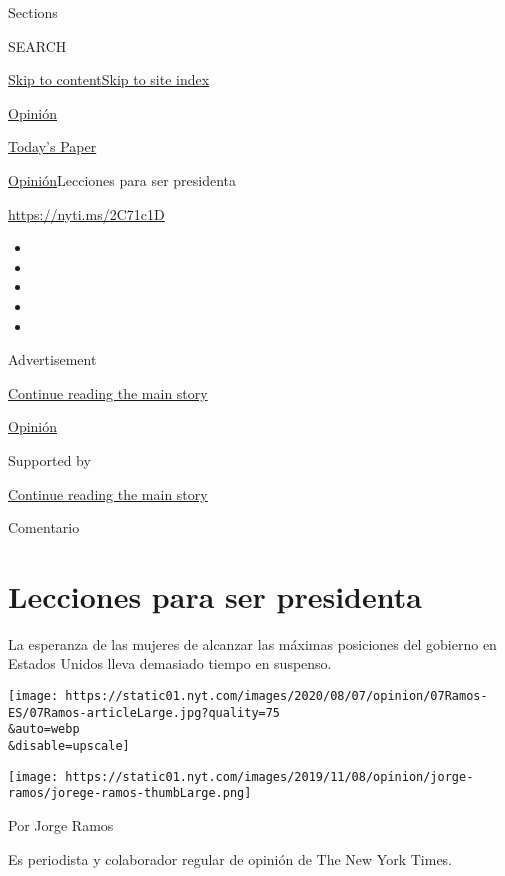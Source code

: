 Sections

SEARCH

\protect\hyperlink{site-content}{Skip to
content}\protect\hyperlink{site-index}{Skip to site index}

\href{https://www.nytimes.com/es/section/opinion}{Opinión}

\href{https://myaccount.nytimes.com/auth/login?response_type=cookie\&client_id=vi}{}

\href{https://www.nytimes.com/section/todayspaper}{Today's Paper}

\href{/es/section/opinion}{Opinión}\textbar{}Lecciones para ser
presidenta

\href{https://nyti.ms/2C71c1D}{https://nyti.ms/2C71c1D}

\begin{itemize}
\item
\item
\item
\item
\item
\end{itemize}

Advertisement

\protect\hyperlink{after-top}{Continue reading the main story}

\href{/es/section/opinion}{Opinión}

Supported by

\protect\hyperlink{after-sponsor}{Continue reading the main story}

Comentario

\hypertarget{lecciones-para-ser-presidenta}{%
\section{Lecciones para ser
presidenta}\label{lecciones-para-ser-presidenta}}

La esperanza de las mujeres de alcanzar las máximas posiciones del
gobierno en Estados Unidos lleva demasiado tiempo en suspenso.

\texttt{[image: https://static01.nyt.com/images/2020/08/07/opinion/07Ramos-ES/07Ramos-articleLarge.jpg?quality=75\\\&auto=webp\\\&disable=upscale]}

\texttt{[image: https://static01.nyt.com/images/2019/11/08/opinion/jorge-ramos/jorege-ramos-thumbLarge.png]}

Por Jorge Ramos

Es periodista y colaborador regular de opinión de The New York Times.

